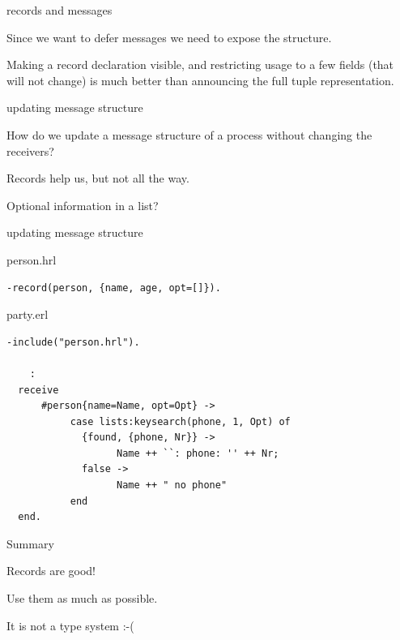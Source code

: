 \begin{frame}{records and messages}

Since we want to defer messages we need to expose the structure.

\pause\vspace{20pt}
Making a record declaration visible, and restricting usage to a few
fields (that will not change) is much better than announcing the full
tuple representation.

\pause\vspace{20pt}

\end{frame}

\begin{frame}[fragile]{updating message structure}

How do we update a message structure of a process without changing the
receivers?

\pause\vspace{20pt}

Records help us, but not all the way.

\pause\vspace{20pt}

Optional information in a list?

\end{frame}


\begin{frame}[fragile]{updating message structure}

\begin{block}{person.hrl}
\begin{verbatim}
-record(person, {name, age, opt=[]}).
\end{verbatim}
\end{block}

\pause\vspace{10pt}
\begin{block}{party.erl}
\begin{verbatim}
-include("person.hrl").
    
    :
  receive 
      #person{name=Name, opt=Opt} -> 
           case lists:keysearch(phone, 1, Opt) of
             {found, {phone, Nr}} ->
                   Name ++ ``: phone: '' ++ Nr;
             false ->
                   Name ++ " no phone"
           end
  end.
\end{verbatim}
\end{block}


\end{frame}



\begin{frame}{Summary}

Records are good!

\pause\vspace{20pt}
Use them as much as possible.

\pause\vspace{20pt}
It is not a type system :-(


\end{frame}





